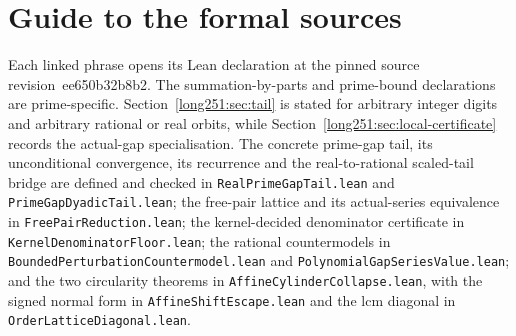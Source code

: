\documentclass[11pt]{article}
\renewcommand{\commitshort}{ee650b32b8b2}
\begin{document}
\section{Guide to the formal sources}\label{long251:app:index}

Each linked phrase opens its Lean declaration at the pinned source
revision~\commitshort.  The summation-by-parts and prime-bound declarations
are prime-specific.  Section~\ref{long251:sec:tail} is stated for arbitrary integer
digits and arbitrary rational or real orbits, while
Section~\ref{long251:sec:local-certificate} records the actual-gap specialisation.  The
concrete prime-gap tail, its unconditional convergence, its recurrence and the
real-to-rational scaled-tail bridge are defined and checked in
\texttt{RealPrimeGapTail.lean} and \texttt{PrimeGapDyadicTail.lean}; the
free-pair lattice and its actual-series equivalence in
\texttt{FreePairReduction.lean}; the kernel-decided denominator certificate in
\texttt{KernelDenominatorFloor.lean}; the rational countermodels in
\texttt{BoundedPerturbationCountermodel.lean} and
\texttt{PolynomialGapSeriesValue.lean}; and the two circularity theorems in
\texttt{AffineCylinderCollapse.lean}, with the signed normal form in
\texttt{AffineShiftEscape.lean} and the lcm diagonal in
\texttt{OrderLatticeDiagonal.lean}.

\iffalse
\end{document}
